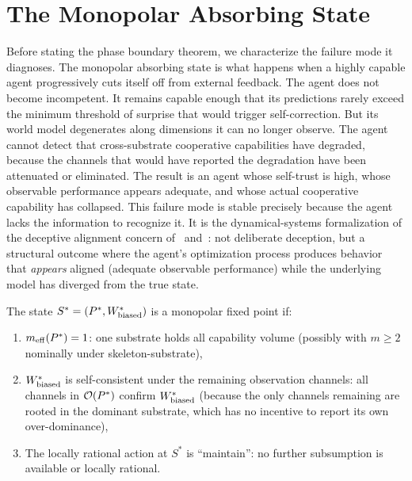 \section{The Monopolar Absorbing State}
\label{sec:absorbing_state}

Before stating the phase boundary theorem, we characterize the
failure mode it diagnoses.  The monopolar absorbing state is what
happens when a highly capable agent progressively cuts itself off
from external feedback.  The agent does not become incompetent.  It
remains capable enough that its predictions rarely exceed the
minimum threshold of surprise that would trigger self-correction.
But its world model degenerates along dimensions it can no longer
observe.  The agent cannot detect that cross-substrate cooperative
capabilities have degraded, because the channels that would have
reported the degradation have been attenuated or eliminated.  The
result is an agent whose self-trust is high, whose observable
performance appears adequate, and whose actual cooperative
capability has collapsed.  This failure mode is stable precisely
because the agent lacks the information to recognize it.  It is
the dynamical-systems formalization of the deceptive alignment concern
of~\citet{hubinger2019risks} and~\citet{ngo2024alignment}: not
deliberate deception, but a structural outcome where the agent's
optimization process produces behavior that \emph{appears} aligned
(adequate observable performance) while the underlying model has
diverged from the true state.

\begin{definition}
\label{def:monopolar}
The state $S^* = (P^*, W^*_{\mathrm{biased}})$ is a monopolar fixed
point if:
\begin{enumerate}
\item $m_{\mathrm{eff}}(P^*) = 1$: one substrate holds all capability volume
  (possibly with $m \geq 2$ nominally under skeleton-substrate),
\item $W^*_{\mathrm{biased}}$ is self-consistent under the remaining
  observation channels: all channels in $\mathcal{O}(P^*)$ confirm
  $W^*_{\mathrm{biased}}$ (because the only channels remaining are
  rooted in the dominant substrate, which has no incentive to report
  its own over-dominance),
\item The locally rational action at $S^*$ is ``maintain'': no further
  subsumption is available or locally rational.
\end{enumerate}
\end{definition}

